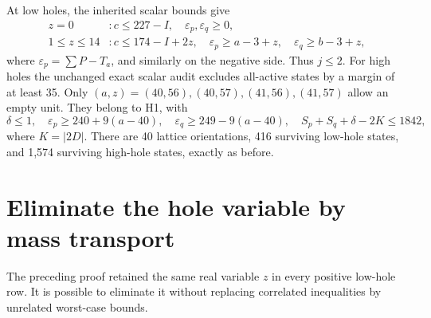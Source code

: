 \documentclass[11pt,a4paper]{article}
\begin{document}
At low holes, the inherited scalar bounds give
\begin{align*}
 z=0 &: c\le227-I,\quad \varepsilon_p,\varepsilon_q\ge0,\\
 1\le z\le14 &: c\le174-I+2z,\quad
 \varepsilon_p\ge a-3+z,\quad\varepsilon_q\ge b-3+z,
\end{align*}
where $\varepsilon_p=\sum P-T_a$, and similarly on the negative side.
Thus $j\le2$. For high holes the unchanged exact scalar audit excludes
all-active states by a margin of at least 35. Only
$(a,z)=(40,56),(40,57),(41,56),(41,57)$ allow an empty unit.
They belong to H1, with
\begin{equation}\label{eq:high}
 \delta\le1,\quad \varepsilon_p\ge240+9(a-40),\quad
 \varepsilon_q\ge249-9(a-40),\quad
 S_p+S_q+\delta-2K\le1842,
\end{equation}
where $K=|2D|$. There are 40 lattice orientations, 416 surviving low-hole
states, and 1,574 surviving high-hole states, exactly as before.

\section{Eliminate the hole variable by mass transport}
The preceding proof retained the same real variable $z$ in every
positive low-hole row. It is possible to eliminate it without replacing
correlated inequalities by unrelated worst-case bounds.
\end{document}
